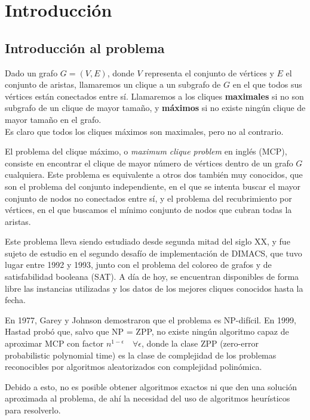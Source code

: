 \chapter{Introducción}\label{ch:introduccionMCP}

\section{Introducción al problema}

Dado un grafo $G = (V, E)$, donde $V$ representa el conjunto de vértices
y $E$ el conjunto de aristas, llamaremos un clique a un subgrafo de $G$
en el que todos sus vértices están conectados entre sí. Llamaremos a los
cliques \textbf{maximales} si no son subgrafo de un clique de mayor tamaño,
y \textbf{máximos} si no existe ningún clique de mayor tamaño en el grafo. \\
Es claro que todos los cliques máximos son maximales, pero no al contrario.

El problema del clique máximo, o \textit{maximum clique problem} en inglés (MCP),
consiste en encontrar el clique de mayor número de vértices dentro de un
grafo $G$ cualquiera. Este problema es equivalente a otros dos también muy conocidos,
que son el problema del conjunto independiente, en el que se intenta buscar el mayor
conjunto de nodos no conectados entre sí, y el problema del recubrimiento por vértices,
en el que buscamos el mínimo conjunto de nodos que cubran todas la aristas.

Este problema lleva siendo estudiado desde segunda mitad del siglo XX, y fue sujeto
de estudio en el segundo desafío de implementación de DIMACS, que tuvo lugar entre 1992
y 1993, junto con el problema del coloreo de grafos y de satisfabilidad booleana (SAT).
A día de hoy, se encuentran disponibles de forma libre las instancias utilizadas y los
datos de los mejores cliques conocidos hasta la fecha.

En 1977, Garey y Johnson demostraron que el problema es NP-difícil. En 1999, Hastad
probó que, salvo que NP = ZPP, no existe ningún algoritmo capaz de aproximar MCP con
factor $n^{1-\epsilon} \quad \forall \epsilon$, donde la clase ZPP (zero-error
probabilistic polynomial time) es la clase de complejidad de los problemas
reconocibles por algoritmos aleatorizados con complejidad polinómica.

Debido a esto, no es posible obtener algoritmos exactos ni que den una solución
aproximada al problema, de ahí la necesidad del uso de algoritmos heurísticos para
resolverlo.


